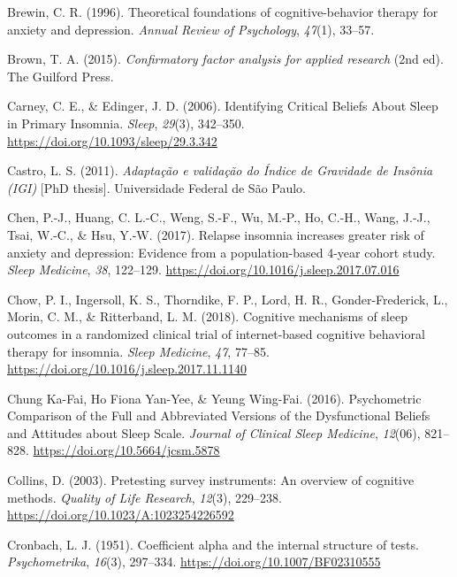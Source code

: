 \documentclass[
  ,doc,11pt, twoside,floatsintext]{apa6}
\newlength{\cslhangindent}
\newlength{\cslentryspacingunit} %
\newenvironment{CSLReferences}[2] %
 {%
  \setlength{\parindent}{0pt}
  \ifodd #1
  \let\oldpar\par
  \def\par{\hangindent=\cslhangindent\oldpar}
  \fi
  \setlength{\parskip}{#2\cslentryspacingunit}
 }%
 {}
\begin{document}
\begin{CSLReferences}{1}{0}
\leavevmode{}%
Brewin, C. R. (1996). Theoretical foundations of cognitive-behavior therapy for anxiety and depression. \emph{Annual Review of Psychology}, \emph{47}(1), 33--57.

\leavevmode{}%
Brown, T. A. (2015). \emph{Confirmatory factor analysis for applied research} (2nd ed). {The Guilford Press}.

\leavevmode{}%
Carney, C. E., \& Edinger, J. D. (2006). Identifying {Critical Beliefs About Sleep} in {Primary Insomnia}. \emph{Sleep}, \emph{29}(3), 342--350. \url{https://doi.org/10.1093/sleep/29.3.342}

\leavevmode{}%
Castro, L. S. (2011). \emph{Adaptação e validação do {Índice} de {Gravidade} de {Insônia} ({IGI})} {[}PhD thesis{]}. Universidade Federal de São Paulo.

\leavevmode{}%
Chen, P.-J., Huang, C. L.-C., Weng, S.-F., Wu, M.-P., Ho, C.-H., Wang, J.-J., Tsai, W.-C., \& Hsu, Y.-W. (2017). Relapse insomnia increases greater risk of anxiety and depression: Evidence from a population-based 4-year cohort study. \emph{Sleep Medicine}, \emph{38}, 122--129. \url{https://doi.org/10.1016/j.sleep.2017.07.016}

\leavevmode{}%
Chow, P. I., Ingersoll, K. S., Thorndike, F. P., Lord, H. R., Gonder-Frederick, L., Morin, C. M., \& Ritterband, L. M. (2018). Cognitive mechanisms of sleep outcomes in a randomized clinical trial of internet-based cognitive behavioral therapy for insomnia. \emph{Sleep Medicine}, \emph{47}, 77--85. \url{https://doi.org/10.1016/j.sleep.2017.11.1140}

\leavevmode{}%
Chung Ka-Fai, Ho Fiona Yan-Yee, \& Yeung Wing-Fai. (2016). Psychometric {Comparison} of the {Full} and {Abbreviated Versions} of the {Dysfunctional Beliefs} and {Attitudes} about {Sleep Scale}. \emph{Journal of Clinical Sleep Medicine}, \emph{12}(06), 821--828. \url{https://doi.org/10.5664/jcsm.5878}

\leavevmode{}%
Collins, D. (2003). Pretesting survey instruments: {An} overview of cognitive methods. \emph{Quality of Life Research}, \emph{12}(3), 229--238. \url{https://doi.org/10.1023/A:1023254226592}

\leavevmode{}%
Cronbach, L. J. (1951). Coefficient alpha and the internal structure of tests. \emph{Psychometrika}, \emph{16}(3), 297--334. \url{https://doi.org/10.1007/BF02310555}


\end{CSLReferences}
\end{document}
